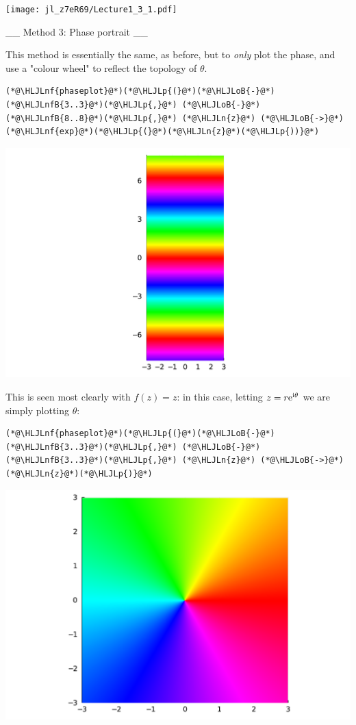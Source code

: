 \documentclass[12pt,a4paper]{article}
\newcommand{\HLJLn}[1]{#1}
\newcommand{\HLJLnf}[1]{\textcolor[RGB]{66,102,213}{#1}}
\newcommand{\HLJLnfB}[1]{\textcolor[RGB]{59,151,46}{#1}}
\newcommand{\HLJLoB}[1]{\textcolor[RGB]{102,102,102}{\textbf{#1}}}
\newcommand{\HLJLp}[1]{#1}
\def\I{ {\rm i} }
\def\E{ {\rm e} }
\begin{document}
\texttt{[image: jl\_z7eR69/Lecture1\_3\_1.pdf]}

\_\_ Method 3: Phase portrait \_\_

This method is essentially the same, as before, but to \emph{only} plot the phase, and use a "colour wheel" to reflect the topology of $\theta$.


\begin{lstlisting}
(*@\HLJLnf{phaseplot}@*)(*@\HLJLp{(}@*)(*@\HLJLoB{-}@*)(*@\HLJLnfB{3..3}@*)(*@\HLJLp{,}@*) (*@\HLJLoB{-}@*)(*@\HLJLnfB{8..8}@*)(*@\HLJLp{,}@*) (*@\HLJLn{z}@*) (*@\HLJLoB{->}@*) (*@\HLJLnf{exp}@*)(*@\HLJLp{(}@*)(*@\HLJLn{z}@*)(*@\HLJLp{))}@*)
\end{lstlisting}

\includegraphics[width=\linewidth]{jl_z7eR69/Lecture1_4_1.pdf}

This is seen most clearly with $f(z) = z$: in this case, letting $z = r \E^{\I \theta}$ we are simply plotting $\theta$:


\begin{lstlisting}
(*@\HLJLnf{phaseplot}@*)(*@\HLJLp{(}@*)(*@\HLJLoB{-}@*)(*@\HLJLnfB{3..3}@*)(*@\HLJLp{,}@*) (*@\HLJLoB{-}@*)(*@\HLJLnfB{3..3}@*)(*@\HLJLp{,}@*) (*@\HLJLn{z}@*) (*@\HLJLoB{->}@*) (*@\HLJLn{z}@*)(*@\HLJLp{)}@*)
\end{lstlisting}

\includegraphics[width=\linewidth]{jl_z7eR69/Lecture1_5_1.pdf}
\end{document}
